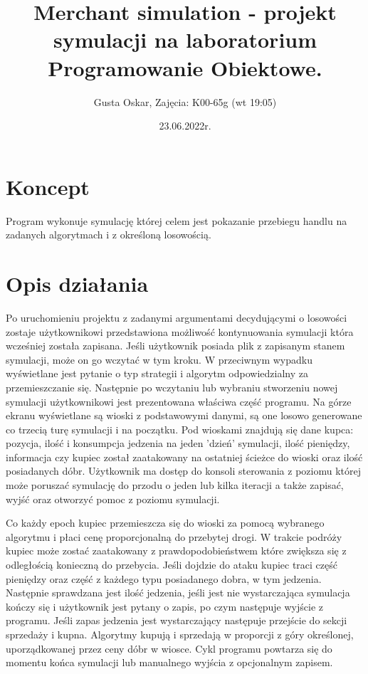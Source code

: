 \documentclass[a4paper,12pt]{article}
\title{Merchant simulation - projekt symulacji na laboratorium Programowanie Obiektowe.}
\author{Gusta Oskar, Zajęcia: K00-65g (wt 19:05)}
\date{23.06.2022r.}
\begin{document}
  \onehalfspacing
  \maketitle
  \newpage
  \tableofcontents
  \newpage

  \section{Koncept}

  Program wykonuje symulację której celem jest pokazanie przebiegu handlu na zadanych algorytmach i z określoną losowością.

  \section{Opis działania}

  Po uruchomieniu projektu z zadanymi argumentami decydującymi o losowości zostaje użytkownikowi przedstawiona możliwość kontynuowania symulacji która wcześniej została zapisana.
  Jeśli użytkownik posiada plik z zapisanym stanem symulacji, może on go wczytać w tym kroku.
  W przeciwnym wypadku wyświetlane jest pytanie o typ strategii i algorytm odpowiedzialny za przemieszczanie się.
  Następnie po wczytaniu lub wybraniu stworzeniu nowej symulacji użytkownikowi jest prezentowana właściwa część programu.
  Na górze ekranu wyświetlane są wioski z podstawowymi danymi, są one losowo generowane co trzecią turę symulacji i na początku.
  Pod wioskami znajdują się dane kupca: pozycja, ilość i konsumpcja jedzenia na jeden 'dzień' symulacji, ilość pieniędzy, informacja czy kupiec został zaatakowany na ostatniej ścieżce do wioski oraz ilość posiadanych dóbr.
  Użytkownik ma dostęp do konsoli sterowania z poziomu której może poruszać symulację do przodu o jeden lub kilka iteracji a także zapisać, wyjść oraz otworzyć pomoc z poziomu symulacji.

  Co każdy epoch kupiec przemieszcza się do wioski za pomocą wybranego algorytmu i płaci cenę proporcjonalną do przebytej drogi.
  W trakcie podróży kupiec może zostać zaatakowany z prawdopodobieństwem które zwiększa się z odległością konieczną do przebycia.
  Jeśli dojdzie do ataku kupiec traci część pieniędzy oraz część z każdego typu posiadanego dobra, w tym jedzenia.
  Następnie sprawdzana jest ilość jedzenia, jeśli jest nie wystarczająca symulacja kończy się i użytkownik jest pytany o zapis, po czym następuje wyjście z programu.
  Jeśli zapas jedzenia jest wystarczający następuje przejście do sekcji sprzedaży i kupna.
  Algorytmy kupują i sprzedają w proporcji z góry określonej, uporządkowanej przez ceny dóbr w wiosce.
  Cykl programu powtarza się do momentu końca symulacji lub manualnego wyjścia z opcjonalnym zapisem.
\end{document}
